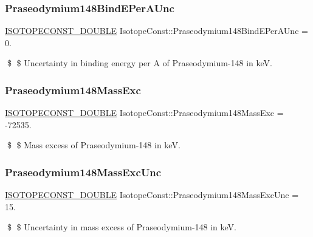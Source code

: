 \subsubsection{\texorpdfstring{Praseodymium148\+Bind\+E\+Per\+A\+Unc}{Praseodymium148BindEPerAUnc}}
{\footnotesize\ttfamily \mbox{\hyperlink{group___isotope_const-_macros_ga8f45a7272ce02c0b4c65c44636ed719a}{I\+S\+O\+T\+O\+P\+E\+C\+O\+N\+S\+T\+\_\+\+D\+O\+U\+B\+LE}} Isotope\+Const\+::\+Praseodymium148\+Bind\+E\+Per\+A\+Unc = 0.}

\$ \$ Uncertainty in binding energy per A of Praseodymium-\/148 in keV. \mbox{\label{group___isotope_const-_praseodymium-_pr148_ga8c274cc8b8b7048c7614dea58a148f01}} 
\subsubsection{\texorpdfstring{Praseodymium148\+Mass\+Exc}{Praseodymium148MassExc}}
{\footnotesize\ttfamily \mbox{\hyperlink{group___isotope_const-_macros_ga8f45a7272ce02c0b4c65c44636ed719a}{I\+S\+O\+T\+O\+P\+E\+C\+O\+N\+S\+T\+\_\+\+D\+O\+U\+B\+LE}} Isotope\+Const\+::\+Praseodymium148\+Mass\+Exc = -\/72535.}

\$ \$ Mass excess of Praseodymium-\/148 in keV. \mbox{\label{group___isotope_const-_praseodymium-_pr148_ga4259f4894c81c59f0fa05e580ce2fe4d}} 
\subsubsection{\texorpdfstring{Praseodymium148\+Mass\+Exc\+Unc}{Praseodymium148MassExcUnc}}
{\footnotesize\ttfamily \mbox{\hyperlink{group___isotope_const-_macros_ga8f45a7272ce02c0b4c65c44636ed719a}{I\+S\+O\+T\+O\+P\+E\+C\+O\+N\+S\+T\+\_\+\+D\+O\+U\+B\+LE}} Isotope\+Const\+::\+Praseodymium148\+Mass\+Exc\+Unc = 15.}

\$ \$ Uncertainty in mass excess of Praseodymium-\/148 in keV. \mbox{\label{group___isotope_const-_praseodymium-_pr148_gaf2626cc3f38b12ce2e671232e3f3af05}} 
